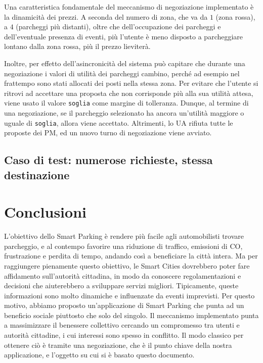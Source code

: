 \documentclass[11pt,a4paper,twoside]{article}
\numberwithin{figure}{section}
\numberwithin{equation}{section}
\begin{document}
Una caratteristica fondamentale del meccanismo di negoziazione implementato è la dinamicità dei prezzi. A seconda del numero di zona, che va da $1$ (zona rossa), a $4$ (parcheggi più distanti), oltre che dell'occupazione dei parcheggi e dell'eventuale presenza di eventi, più l'utente è meno disposto a parcheggiare lontano dalla zona rossa, più il prezzo lieviterà.

Inoltre, per effetto dell'asincronicità del sistema può capitare che durante una negoziazione i valori di utilità dei parcheggi cambino, perché ad esempio nel frattempo sono stati allocati dei posti nella stessa zona. Per evitare che l'utente si ritrovi ad accettare una proposta che non corrisponde più alla sua utilità attesa, viene usato il valore \texttt{soglia} come margine di tolleranza. Dunque, al termine di una negoziazione, se il parcheggio selezionato ha ancora un'utilità maggiore o uguale di \texttt{soglia}, allora viene accettato. Altrimenti, lo UA rifiuta tutte le proposte dei PM, ed un nuovo turno di negoziazione viene avviato.

\subsection{Caso di test: numerose richieste, stessa destinazione}

\section{Conclusioni}

L'obiettivo dello Smart Parking è rendere più facile agli automobilisti trovare parcheggio, e al contempo favorire una riduzione di traffico, emissioni di CO, frustrazione e perdita di tempo, andando così a beneficiare la città intera.
Ma per raggiungere pienamente questo obiettivo, le Smart Cities dovrebbero poter fare affidamento sull'autorità cittadina, in modo da conoscere regolamentazioni e decisioni che aiuterebbero a sviluppare servizi migliori.
Tipicamente, queste informazioni sono molto dinamiche e influenzate da eventi imprevisti.
Per questo motivo, abbiamo proposto un'applicazione di Smart Parking che punta ad un beneficio sociale piuttosto che solo del singolo.
Il meccanismo implementato punta a massimizzare il benessere collettivo cercando un compromesso tra utenti e autorità cittadine, i cui interessi sono spesso in conflitto.
Il modo classico per ottenere ciò è tramite una negoziazione, che è il punto chiave della nostra applicazione, e l'oggetto su cui si è basato questo documento.

\nocite{*}

\renewcommand\refname{Riferimenti}

\end{document}
